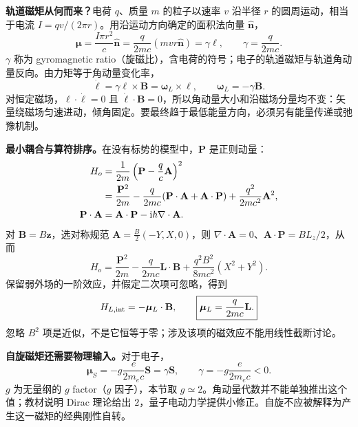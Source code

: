 \textbf{轨道磁矩从何而来？}电荷 $q$、质量 $m$ 的粒子以速率 $v$ 沿半径 $r$ 的圆周运动，相当于电流 $I=qv/(2\pi r)$。用沿运动方向确定的面积法向量 $\hat{\mathbf n}$，
\begin{equation}
  \boldsymbol\mu=\frac{I\pi r^2}{c}\hat{\mathbf n}
    =\frac{q}{2mc}(mvr\hat{\mathbf n})
    =\gamma\boldsymbol\ell,\qquad
  \boxed{\gamma=\frac{q}{2mc}.}
\end{equation}
$\gamma$ 称为 gyromagnetic ratio（旋磁比），含电荷的符号；电子的轨道磁矩与轨道角动量反向。由力矩等于角动量变化率，
\begin{equation}
  \dot{\boldsymbol\ell}=\gamma\boldsymbol\ell\times\mathbf B
    =\boldsymbol\omega_L\times\boldsymbol\ell,\qquad
  \boxed{\boldsymbol\omega_L=-\gamma\mathbf B.}
\end{equation}
对恒定磁场，$\boldsymbol\ell\cdot\dot{\boldsymbol\ell}=0$ 且 $\dot{\boldsymbol\ell}\cdot\mathbf B=0$，所以角动量大小和沿磁场分量均不变：矢量绕磁场匀速进动，倾角固定。要最终趋于最低能量方向，必须另有能量传递或弛豫机制。

\textbf{最小耦合与算符排序。}在没有标势的模型中，$\mathbf P$ 是正则动量：
\begin{align}
  H_o&=\frac1{2m}\left(\mathbf P-\frac qc\mathbf A\right)^2\notag\\
    &=\frac{\mathbf P^2}{2m}
       -\frac{q}{2mc}(\mathbf P\cdot\mathbf A+\mathbf A\cdot\mathbf P)
       +\frac{q^2}{2mc^2}\mathbf A^2,\\
  \mathbf P\cdot\mathbf A
    &=\mathbf A\cdot\mathbf P-\mathrm{i}\hbar\nabla\cdot\mathbf A.
\end{align}
对 $\mathbf B=B\hat{\mathbf z}$，选对称规范
$\mathbf A=\tfrac B2(-Y,X,0)$，则 $\nabla\cdot\mathbf A=0$、$\mathbf A\cdot\mathbf P=BL_z/2$，从而
\begin{equation}
  H_o=\frac{\mathbf P^2}{2m}-\frac{q}{2mc}\mathbf L\cdot\mathbf B
       +\frac{q^2B^2}{8mc^2}(X^2+Y^2).
\end{equation}
保留弱外场的一阶效应，并假定二次项可忽略，得到
\begin{equation}
  H_{L,\rm int}=-\boldsymbol\mu_L\cdot\mathbf B,\qquad
  \boxed{\boldsymbol\mu_L=\frac{q}{2mc}\mathbf L.}
\end{equation}
忽略 $B^2$ 项是近似，不是它恒等于零；涉及该项的磁效应不能用线性截断讨论。

\textbf{自旋磁矩还需要物理输入。}对于电子，
\begin{equation}
  \boxed{\boldsymbol\mu_S=-g\frac{e}{2m_ec}\mathbf S
    =\gamma\mathbf S,\qquad
    \gamma=-g\frac{e}{2m_ec}<0.}
\end{equation}
$g$ 为无量纲的 $g$ factor（$g$ 因子），本节取 $g\simeq2$。角动量代数并不能单独推出这个值；教材说明 Dirac 理论给出 $2$，量子电动力学提供小修正。自旋不应被解释为产生这一磁矩的经典刚性自转。

